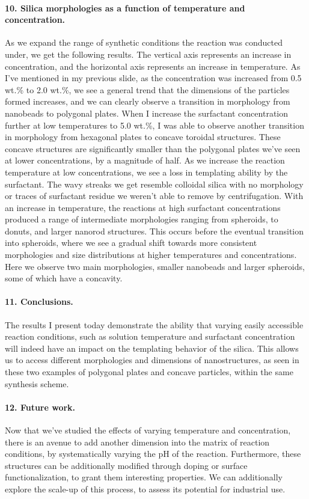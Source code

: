 \documentclass[a4paper,12pt]{article}
\begin{document}
\paragraph{10. Silica morphologies as a function of temperature and concentration.}As we expand the range of synthetic conditions the reaction was conducted under, we get the following results. The vertical axis represents an increase in concentration, and the horizontal axis represents an increase in temperature.
\bigbreak
As I've mentioned in my previous slide, as the concentration was increased from 0.5 wt.\% to 2.0 wt.\%, we see a general trend that the dimensions of the particles formed increases, and we can clearly observe a transition in morphology from nanobeads to polygonal plates.
\bigbreak
When I increase the surfactant concentration further at low temperatures to 5.0 wt.\%, I was able to observe another transition in morphology from hexagonal plates to concave toroidal structures. These concave structures are significantly smaller than the polygonal plates we've seen at lower concentrations, by a magnitude of half.
\bigbreak
As we increase the reaction temperature at low concentrations, we see a loss in templating ability by the surfactant. The wavy streaks we get resemble colloidal silica with no morphology or traces of surfactant residue we weren't able to remove by centrifugation. 
\bigbreak
With an increase in temperature, the reactions at high surfactant concentrations produced a range of intermediate morphologies ranging from spheroids, to donuts, and larger nanorod structures. This occurs before the eventual transition into spheroids, where we see a gradual shift towards more consistent morphologies and size distributions at higher temperatures and concentrations. Here we observe two main morphologies, smaller nanobeads and larger spheroids, some of which have a concavity.

\paragraph{11. Conclusions.}The results I present today demonstrate the ability that varying easily accessible reaction conditions, such as solution temperature and surfactant concentration will indeed have an impact on the templating behavior of the silica.
\bigbreak
This allows us to access different morphologies and dimensions of nanostructures, as seen in these two examples of polygonal plates and concave particles, within the same synthesis scheme.

\paragraph{12. Future work.}Now that we've studied the effects of varying temperature and concentration, there is an avenue to add another dimension into the matrix of reaction conditions, by systematically varying the pH of the reaction.
\bigbreak
Furthermore, these structures can be additionally modified through doping or surface functionalization, to grant them interesting properties. We can additionally explore the scale-up of this process, to assess its potential for industrial use.
\end{document}
